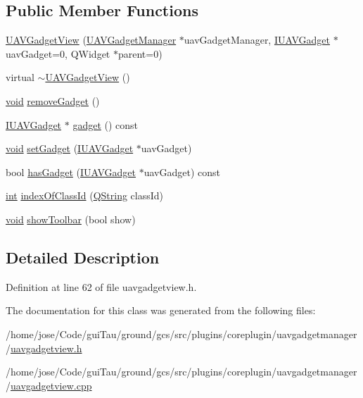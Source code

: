 \subsection*{Public Member Functions}
\begin{DoxyCompactItemize}
\item 
\hyperlink{group___core_plugin_ga8fa8689dc8007240a249ca30aab120bc}{U\-A\-V\-Gadget\-View} (\hyperlink{class_core_1_1_u_a_v_gadget_manager}{U\-A\-V\-Gadget\-Manager} $\ast$uav\-Gadget\-Manager, \hyperlink{class_core_1_1_i_u_a_v_gadget}{I\-U\-A\-V\-Gadget} $\ast$uav\-Gadget=0, Q\-Widget $\ast$parent=0)
\item 
virtual \hyperlink{group___core_plugin_gaff77698d025839fe1253c9f844047967}{$\sim$\-U\-A\-V\-Gadget\-View} ()
\item 
\hyperlink{group___u_a_v_objects_plugin_ga444cf2ff3f0ecbe028adce838d373f5c}{void} \hyperlink{group___core_plugin_ga79f72e55f40ebeb515dd18587828dded}{remove\-Gadget} ()
\item 
\hyperlink{class_core_1_1_i_u_a_v_gadget}{I\-U\-A\-V\-Gadget} $\ast$ \hyperlink{group___core_plugin_ga61a5d78cd9753fa2d7521c742bdc1c99}{gadget} () const 
\item 
\hyperlink{group___u_a_v_objects_plugin_ga444cf2ff3f0ecbe028adce838d373f5c}{void} \hyperlink{group___core_plugin_gacc71a644bd52654f20b8761311a0162f}{set\-Gadget} (\hyperlink{class_core_1_1_i_u_a_v_gadget}{I\-U\-A\-V\-Gadget} $\ast$uav\-Gadget)
\item 
bool \hyperlink{group___core_plugin_ga09521ecca6702f1ce2904776b2c5d643}{has\-Gadget} (\hyperlink{class_core_1_1_i_u_a_v_gadget}{I\-U\-A\-V\-Gadget} $\ast$uav\-Gadget) const 
\item 
\hyperlink{ioapi_8h_a787fa3cf048117ba7123753c1e74fcd6}{int} \hyperlink{group___core_plugin_ga6b3bf8413c3b5d8d7eba4b046104a42c}{index\-Of\-Class\-Id} (\hyperlink{group___u_a_v_objects_plugin_gab9d252f49c333c94a72f97ce3105a32d}{Q\-String} class\-Id)
\item 
\hyperlink{group___u_a_v_objects_plugin_ga444cf2ff3f0ecbe028adce838d373f5c}{void} \hyperlink{group___core_plugin_ga0d98a8e6e0902672ffc3c977fbebb7b6}{show\-Toolbar} (bool show)
\end{DoxyCompactItemize}


\subsection{Detailed Description}


Definition at line 62 of file uavgadgetview.\-h.



The documentation for this class was generated from the following files\-:\begin{DoxyCompactItemize}
\item 
/home/jose/\-Code/gui\-Tau/ground/gcs/src/plugins/coreplugin/uavgadgetmanager/\hyperlink{uavgadgetview_8h}{uavgadgetview.\-h}\item 
/home/jose/\-Code/gui\-Tau/ground/gcs/src/plugins/coreplugin/uavgadgetmanager/\hyperlink{uavgadgetview_8cpp}{uavgadgetview.\-cpp}\end{DoxyCompactItemize}
